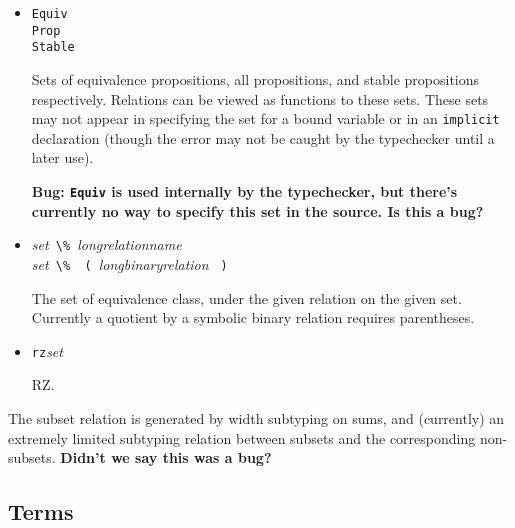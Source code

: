 \documentclass{article}
\newcommand{\keywd}[1]{\mbox{\texttt{#1}}\xspace}
\newcommand{\EQUIVPROP}{\keywd{Equiv}}
\newcommand{\IMPLICIT}{\keywd{implicit}}
\newcommand{\PROP}{\keywd{Prop}}
\newcommand{\RZ}{\keywd{rz}}
\newcommand{\STABLEPROP}{\keywd{Stable}}
\newcommand{\metav}[1]{\mbox{\textit{#1}}\xspace}
\newcommand{\Setexp}{\metav{set}}
\newcommand{\LPAREN}{\mbox{\Verb| ( |}}
\newcommand{\PERCENT}{\mbox{\Verb+ \% +}}
\newcommand{\RPAREN}{\mbox{\Verb| ) |}}
\begin{document}
\begin{itemize}
\item \EQUIVPROP\\
      \PROP\\
      \STABLEPROP

  Sets of equivalence propositions, all propositions, and stable
  propositions respectively.  Relations can be viewed as functions
  to these sets.  These sets may not appear in specifying the set
  for a bound variable or in an \IMPLICIT declaration (though
  the error may not be caught by the typechecker until a later use).

\textbf{Bug:  \EQUIVPROP is used internally by the typechecker,
  but there's currently no way to specify this set in the source.
  Is this a bug?}

\item \Setexp \PERCENT \metav{longrelationname}\\
      \Setexp \PERCENT \LPAREN \metav{longbinaryrelation} \RPAREN

  The set of equivalence class, under the given relation on the
  given set. Currently a quotient by a symbolic binary relation requires
  parentheses.

\item \RZ \Setexp

  RZ.
\end{itemize}


The subset relation is generated by width subtyping on sums, and
(currently) an extremely limited subtyping relation between
subsets and the corresponding non-subsets.  
\textbf{Didn't we say this was a bug?}

\subsection{Terms}
\end{document}
